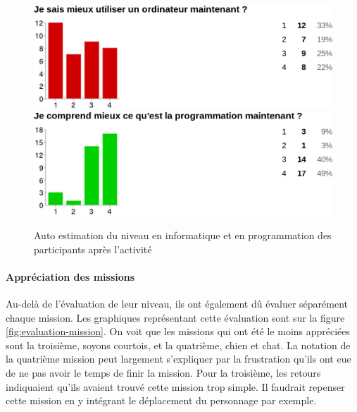\begin{figure}[]
  \begin{center}
    \includegraphics[width=\textwidth]{content/8-validation/images/apres}
    \includegraphics[width=\textwidth]{content/8-validation/images/apres-programmation}
    \caption{Auto estimation du niveau en informatique et en programmation des participants après l'activité}
    \label{fig:niveau-apres}
  \end{center}
\end{figure}

\paragraph{Appréciation des missions}
\label{appreciation}
Au-delà de l'évaluation de leur niveau, ils ont également dû évaluer séparément chaque mission. Les graphiques représentant cette évaluation sont sur la figure \ref{fig:evaluation-mission}. On voit que les missions qui ont été le moins appréciées sont la troisième, soyons courtois, et la quatrième, chien et chat. La notation de la quatrième mission peut largement s'expliquer par la frustration qu'ils ont eue de ne pas avoir le temps de finir la mission. Pour la troisième, les retours indiquaient qu'ils avaient trouvé cette mission trop simple. Il faudrait repenser cette mission en y intégrant le déplacement du personnage par exemple.\\


